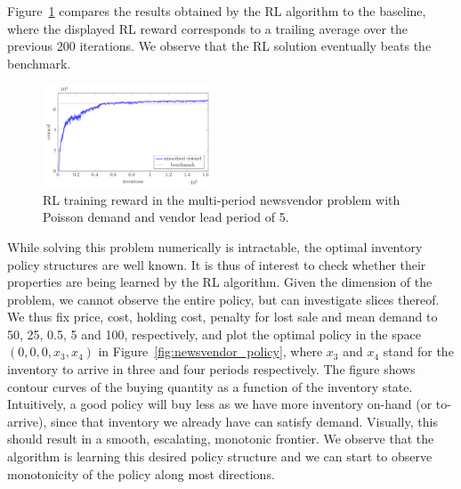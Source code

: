 \documentclass[letterpaper]{article} %
\begin{document}

Figure~\ref{fig:newsvendor_TRPO} compares the results obtained by the RL algorithm to the baseline, where the displayed RL reward corresponds to a trailing average over the previous 200 iterations. We observe that the RL solution eventually beats the benchmark.


\begin{figure}
	\centering
	\includegraphics[width=0.45\textwidth]{images/newsvendor_trpo_reward.pdf}
	\caption{RL training reward in the multi-period newsvendor problem with Poisson demand and vendor lead period of 5.}
	\label{fig:newsvendor_TRPO}
\end{figure}

While solving this problem numerically is intractable, the optimal inventory policy structures are well known. It is thus of interest to check whether their properties are being learned by the RL algorithm. Given the dimension of the problem, we cannot observe the entire policy, but can investigate slices thereof. We thus fix price, cost, holding cost, penalty for lost sale and mean demand to 50, 25, 0.5, 5 and 100, respectively, and plot the optimal policy in the space $(0,0,0,x_3,x_4)$ in Figure~\ref{fig:newsvendor_policy}, where $x_3$ and $x_4$ stand for the inventory to arrive in three and four periods respectively. The figure shows contour curves of the buying quantity as a function of the inventory state. Intuitively, a good policy will buy less as we have more inventory on-hand (or to-arrive), since that inventory we already have can satisfy demand.  Visually, this should result in a smooth, escalating, monotonic frontier.  We observe that the algorithm is learning this desired policy structure and we can start to observe monotonicity of the policy along most directions.
\end{document}

